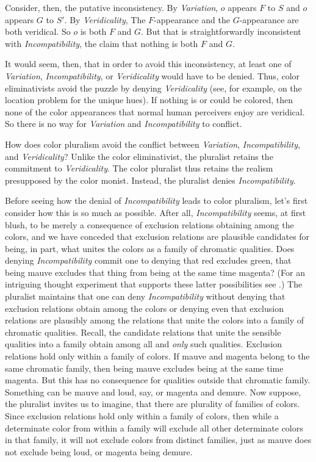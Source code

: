 \documentclass[12pt]{article}
\begin{document}
Consider, then, the putative inconsistency. By \emph{Variation}, \( o \) appears \( F \) to \( S \) and \( o \) appears \( G \) to \( S' \). By \emph{Veridicality}, The \( F \)-appearance and the \( G \)-appearance are both veridical. So \( o \) is both \( F \) and \( G \). But that is straightforwardly inconsistent with \emph{Incompatibility}, the claim that nothing is both \( F \) and \( G \). 

It would seem, then, that in order to avoid this inconsistency, at least one of \emph{Variation}, \emph{Incompatibility}, or \emph{Veridicality} would have to be denied. Thus, color eliminativists avoid the puzzle by denying \emph{Veridicality} (see, for example, \citealt{Hardin:1993kn} on the location problem for the unique hues). If nothing is or could be colored, then none of the color appearances that normal human perceivers enjoy are veridical. So there is no way for \emph{Variation} and \emph{Incompatibility} to conflict.

How does color pluralism avoid the conflict between \emph{Variation}, \emph{Incompatibility}, and \emph{Veridicality}? Unlike the color eliminativist, the pluralist retains the commitment to \emph{Veridicality}. The color pluralist thus retains the realism presupposed by the color monist. Instead, the pluralist denies \emph{Incompatibility}.

Before seeing how the denial of \emph{Incompatibility} leads to color pluralism, let's first consider how this is so much as possible. After all, \emph{Incompatibility} seems, at first blush, to be merely a consequence of exclusion relations obtaining among the colors, and we have conceded that exclusion relations are plausible candidates for being, in part, what unites the colors as a family of chromatic qualities. Does denying \emph{Incompatibility} commit one to denying that red excludes green, that being mauve excludes that thing from being at the same time magenta? (For an intriguing thought experiment that supports these latter possibilities see \citealt{Harman:2001mv}.) The pluralist maintains that one can deny \emph{Incompatibility} without denying that exclusion relations obtain among the colors or denying even that exclusion relations are plausibly among the relations that unite the colors into a family of chromatic qualities. Recall, the candidate relations that unite the sensible qualities into a family obtain among all and \emph{only} such qualities. Exclusion relations hold only within a family of colors. If mauve and magenta belong to the same chromatic family, then being mauve excludes being at the same time magenta. But this has no consequence for qualities outside that chromatic family. Something can be mauve and loud, say, or magenta and demure. Now suppose, the pluralist invites us to imagine, that there are plurality of families of colors. Since exclusion relations hold only within a family of colors, then while a determinate color from within a family will exclude all other determinate colors in that family, it will not exclude colors from distinct families, just as mauve does not exclude being loud, or magenta being demure.
\end{document}

